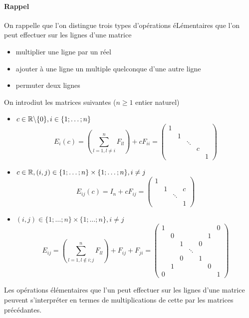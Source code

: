 \paragraph{Rappel} On rappelle que l'on distingue trois types d'opérations éLémentaires que l'on peut effectuer sur les lignes d'une matrice
\begin{itemize}
  \item multiplier une ligne par un réel
  \item ajouter à une ligne un multiple quelconque d'une autre ligne
  \item permuter deux lignes
\end{itemize}
On introdiut les matrices suivantes ($n \geq 1$ entier naturel)
\begin{itemize}
  \item $c \in \mathbb{R} \backslash \{0 \}, i \in \{1; \ldots; n\}$
    $$E_i(c) = \left( \sum_{l=1, l\neq i}^n F_{ll} \right) +  c F_{ii} = 
      \begin{pmatrix}
        1 & & \\
        & 1 & \\
        & & \ddots & \\
        & & & c & \\
        & & & & 1
      \end{pmatrix}$$
      
  \item $c \in \mathbb{R}, (i, j) \in \{1;\ldots;n\}\times\{1;\ldots;n\}, i\neq j$
    $$E_{ij}(c) = I_n + c F_{ij} =
      \begin{pmatrix}
        1 & & & \\
        & 1 & & c \\
        & & \ddots & \\
        & & & 1
      \end{pmatrix}$$
      
  \item $(i, j) \in \{1; \ldots; n\}\times\{1;\ldots; n\}, i\neq j$
    $$E_{ij} = \left( \sum_{l=1, l \notin {i; j}}^n F_{ll} \right) + F_{ij} + F_{ji} = 
      \begin{pmatrix}
        1 & & & & & & 0 \\
        & 0 & & & & 1 & \\
        & & 1 & & 0 & & \\
        & & & \ddots & & & \\
        & & 0 & & 1 & & \\
        & 1 & & & & 0 & \\
        0 & & & & & & 1
      \end{pmatrix}$$
\end{itemize} 
Les opérations élémentaires que l'un peut effectuer sur les lignes d'une matrice peuvent s'interpréter en termes de multiplications de cette par les matrices précédantes.

